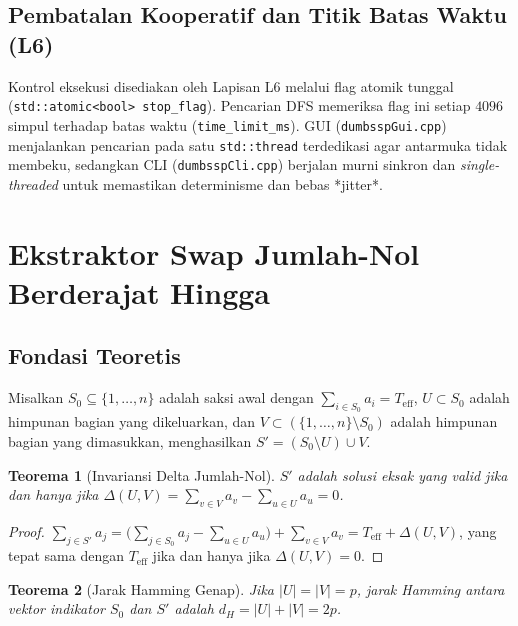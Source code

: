 \documentclass[journal,onecolumn,11pt]{IEEEtran}
\newtheorem{theorem}{Teorema}
\begin{document}
\subsection{Pembatalan Kooperatif dan Titik Batas Waktu (L6)}
\label{sec:l6-cancellation}
Kontrol eksekusi disediakan oleh Lapisan L6 melalui flag atomik tunggal (\texttt{std::atomic<bool> stop\_flag}). Pencarian DFS memeriksa flag ini setiap $4096$ simpul terhadap batas waktu (\texttt{time\_limit\_ms}). GUI (\texttt{dumbsspGui.cpp}) menjalankan pencarian pada satu \texttt{std::thread} terdedikasi agar antarmuka tidak membeku, sedangkan CLI (\texttt{dumbsspCli.cpp}) berjalan murni sinkron dan \textit{single-threaded} untuk memastikan determinisme dan bebas *jitter*.

\section{Ekstraktor Swap Jumlah-Nol Berderajat Hingga}
\label{sec:swap_manifold}

\subsection{Fondasi Teoretis}
Misalkan $S_0\subseteq\{1,\dots,n\}$ adalah saksi awal dengan $\sum_{i\in S_0}a_i=T_{\text{eff}}$, $U\subset S_0$ adalah himpunan bagian yang dikeluarkan, dan $V\subset(\{1,\dots,n\}\setminus S_0)$ adalah himpunan bagian yang dimasukkan, menghasilkan $S' = (S_0\setminus U)\cup V$.

\begin{theorem}[Invariansi Delta Jumlah-Nol]
\label{thm:zero_sum}
$S'$ adalah solusi eksak yang valid jika dan hanya jika $\Delta(U,V) = \sum_{v\in V}a_v - \sum_{u\in U}a_u = 0$.
\end{theorem}
\begin{proof}
$\sum_{j\in S'}a_j = \big(\sum_{j\in S_0}a_j - \sum_{u\in U}a_u\big) + \sum_{v\in V}a_v = T_{\text{eff}} + \Delta(U,V)$, yang tepat sama dengan $T_{\text{eff}}$ jika dan hanya jika $\Delta(U,V)=0$.
\end{proof}

\begin{theorem}[Jarak Hamming Genap]
\label{thm:hamming}
Jika $|U|=|V|=p$, jarak Hamming antara vektor indikator $S_0$ dan $S'$ adalah $d_H = |U|+|V| = 2p$.
\end{theorem}
\end{document}
